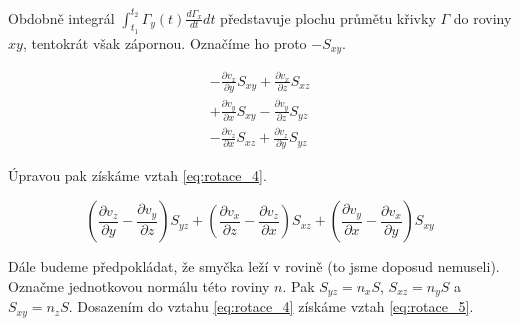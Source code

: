 \documentclass{book}
\begin{document}

Obdobně integrál \(\int_{t_1}^{t_2} \Gamma_y(t) \frac{d \Gamma_x}{dt} dt\) představuje plochu průmětu křivky \(\Gamma\) do roviny \(xy\), tentokrát však zápornou. Označíme ho proto \(-S_{xy}\).

\begin{equation}
\label{eq:rotace_3}
\begin{matrix}
-\frac{\partial v_x}{\partial y} S_{xy} + \frac{\partial v_x}{\partial z} S_{xz} \\
+ \frac{\partial v_y}{\partial x} S_{xy} - \frac{\partial v_y}{\partial z} S_{yz} \\
- \frac{\partial v_z}{\partial x} S_{xz} + \frac{\partial v_z}{\partial y} S_{yz}
\end{matrix}
\end{equation}

Úpravou pak získáme vztah \eqref{eq:rotace_4}.

\begin{equation}
\label{eq:rotace_4}
\left( \frac{\partial v_z}{\partial y} - \frac{\partial v_y}{\partial z} \right) S_{yz} + \left( \frac{\partial v_x}{\partial z} - \frac{\partial v_z}{\partial x} \right) S_{xz} + \left( \frac{\partial v_y}{\partial x} - \frac{\partial v_x}{\partial y} \right) S_{xy} 
\end{equation}

Dále budeme předpokládat, že smyčka leží v rovině (to jsme doposud nemuseli). Označme jednotkovou normálu této roviny \(n\). Pak \(S_{yz} = n_x S\), \(S_{xz} = n_y S\) a \(S_{xy} = n_z S\). Dosazením do vztahu \eqref{eq:rotace_4} získáme vztah \eqref{eq:rotace_5}.
\end{document}
